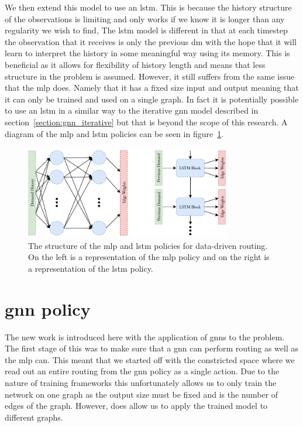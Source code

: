 We then extend this model to use an \acf{lstm}\cite{hochreiter1997long}. This is because the history structure of the observations is limiting and only works if we know it is longer than any regularity we wish to find, The \ac{lstm} model is different in that at each timestep the observation that it receives is only the previous \ac{dm} with the hope that it will learn to interpret the history in some meaningful way using its memory. This is beneficial as it allows for flexibility of history length and means that less structure in the problem is assumed. However, it still suffers from the same issue that the \ac{mlp} does. Namely that it has a fixed size input and output meaning that it can only be trained and used on a single graph. In fact it is potentially possible to use an \ac{lstm} in a similar way to the iterative \ac{gnn} model described in section~\ref{section:gnn_iterative} but that is beyond the scope of this research. A diagram of the \ac{mlp} and \ac{lstm} policies can be seen in figure~\ref{fig:mlp_lstm}.

\begin{figure}
    \centering
    \includegraphics[width=0.8\textwidth]{figures/mlp_lstm.pdf}
    \caption{The structure of the \ac{mlp} and \ac{lstm} policies for data-driven routing. On the left is a representation of the \ac{mlp} policy and on the right is a representation of the \ac{lstm} policy.}
    \label{fig:mlp_lstm}
\end{figure}


\section{\ac{gnn} policy}
\label{section:gnn_policy}
The new work is introduced here with the application of \acp{gnn} to the problem. The first stage of this was to make sure that a \ac{gnn} can perform routing as well as the \ac{mlp} can. This meant that we started off with the constricted space where we read out an entire routing from the \ac{gnn} policy as a single action. Due to the nature of training frameworks this unfortunately allows us to only train the network on one graph as the output size must be fixed and is the number of edges of the graph. However, does allow us to apply the trained model to different graphs.

